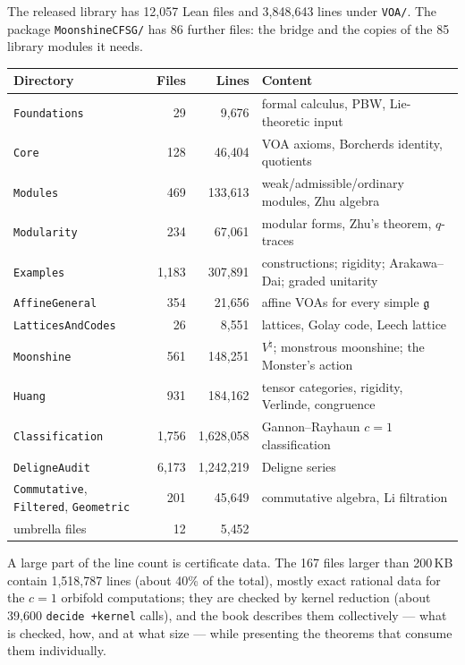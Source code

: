 \documentclass[10pt]{article}
\newcommand{\g}{\mathfrak{g}}
\begin{document}
The released library has 12{,}057 Lean files and 3{,}848{,}643 lines under \texttt{VOA/}. The package
\texttt{MoonshineCFSG/} has 86 further files: the bridge and the copies of the 85 library modules it needs.

\begin{center}\small
  \begin{tabular}{lrrl}
    \toprule
    Directory & Files & Lines & Content\\
    \midrule
    \texttt{Foundations} & 29 & 9{,}676 & formal calculus, PBW, Lie-theoretic input\\
    \texttt{Core} & 128 & 46{,}404 & VOA axioms, Borcherds identity, quotients\\
    \texttt{Modules} & 469 & 133{,}613 & weak/admissible/ordinary modules, Zhu algebra\\
    \texttt{Modularity} & 234 & 67{,}061 & modular forms, Zhu's theorem, $q$-traces\\
    \texttt{Examples} & 1{,}183 & 307{,}891 & constructions; rigidity; Arakawa--Dai; graded unitarity\\
    \texttt{AffineGeneral} & 354 & 21{,}656 & affine VOAs for every simple $\g$\\
    \texttt{LatticesAndCodes} & 26 & 8{,}551 & lattices, Golay code, Leech lattice\\
    \texttt{Moonshine} & 561 & 148{,}251 & $V^\natural$; monstrous moonshine; the Monster's action\\
    \texttt{Huang} & 931 & 184{,}162 & tensor categories, rigidity, Verlinde, congruence\\
    \texttt{Classification} & 1{,}756 & 1{,}628{,}058 & Gannon--Rayhaun $c=1$ classification\\
    \texttt{DeligneAudit} & 6{,}173 & 1{,}242{,}219 & Deligne series\\
    \texttt{Commutative}, \texttt{Filtered}, \texttt{Geometric} & 201 & 45{,}649 & commutative algebra, Li filtration\\
    umbrella files & 12 & 5{,}452 & \\
    \bottomrule
  \end{tabular}
\end{center}

A large part of the line count is certificate data. The 167 files larger than 200\,KB contain 1{,}518{,}787 lines
(about 40\% of the total), mostly exact rational data for the $c=1$ orbifold computations; they are checked by kernel
reduction (about 39{,}600 \texttt{decide +kernel} calls), and the book describes them collectively --- what is checked,
how, and at what size --- while presenting the theorems that consume them individually.
\end{document}
